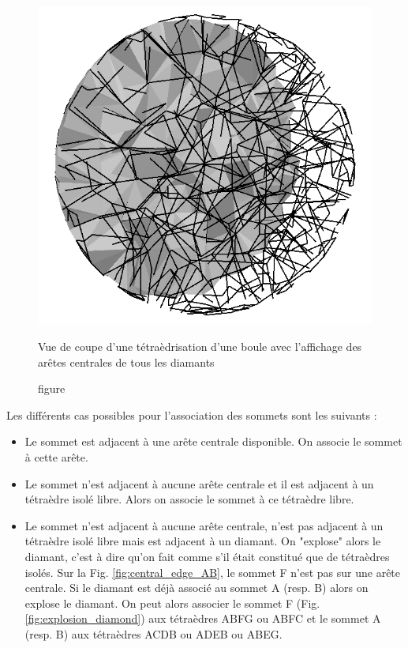 \documentclass[a4paper,11pt,openany]{article}
\begin{document}
\begin{figure}[H]
\begin{minipage}{.5\textwidth}
  \includegraphics[scale=0.2]{Images/central_edges}
  \caption{figure}{Vue de coupe d'une tétraèdrisation d'une boule avec l'affichage des arêtes centrales de tous les diamants}
  \label{fig:central_edges}
\end{minipage}
\end{figure}
\noindent
Les différents cas possibles pour l'association des sommets sont les suivants :\\
\begin{itemize}
\item Le sommet est adjacent à une arête centrale disponible. On associe le sommet à cette arête.
\item Le sommet n'est adjacent à aucune arête centrale et il est adjacent à un tétraèdre isolé libre. Alors on associe le sommet à ce tétraèdre libre.
\item Le sommet n'est adjacent à aucune arête centrale, n'est pas adjacent à un tétraèdre isolé libre mais est adjacent à un diamant. On "explose" alors le diamant, c'est à dire qu'on fait comme s'il était constitué que de tétraèdres isolés. Sur la Fig. \ref{fig:central_edge_AB}, le sommet F n'est pas sur une arête centrale. Si le diamant est déjà associé au sommet A (resp. B) alors on explose le diamant. On peut alors associer le sommet F (Fig. \ref{fig:explosion_diamond}) aux tétraèdres ABFG ou ABFC et le sommet A (resp. B) aux tétraèdres ACDB ou ADEB ou ABEG.
\end{itemize}
\end{document}
